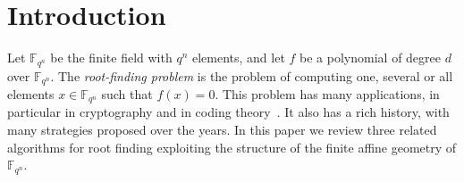 \documentclass{sig-alternate}
\newcommand{\ff}[1]{\mathbb{F}_{#1}}
\newcommand{\dd}{d}
\newcommand{\qq}{q}
\newcommand{\nn}{n}
\newcommand{\qn}{{\qq^\nn}}
\newcommand{\basef}{\ff{\qq}}
\newcommand{\extf}{\ff{\qn}}
\newcounter{algo}
\newcommand{\todo}[1]{\textcolor{red}{TODO: #1}}
\begin{document}
\section{Introduction}

Let $\mathbb{F}_{\qq^\nn}$ be the finite field with $\qq^\nn$ elements, and let $f$ be a polynomial of degree $\dd$ over $\mathbb{F}_{\qq^\nn}$.
%
The \emph{root-finding problem} is the problem of computing one, several or all elements $x\in\mathbb{F}_{\qq^\nn}$ such that $f(x)=0$.
%
This problem has many applications, in particular in cryptography and in coding theory~\cite{McEliece78}. It also has a rich history, with many strategies proposed over the years. In this paper we review three related algorithms for root finding exploiting the structure of the finite affine geometry of $\extf$.



%
%




 
\end{document}
